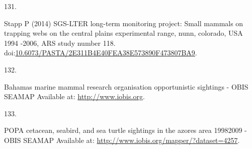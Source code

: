 \documentclass{article}
\newlength{\cslhangindent}
\newlength{\csllabelwidth}
\newlength{\cslentryspacingunit} %
\newenvironment{CSLReferences}[2] %
 {%
  \setlength{\parindent}{0pt}
  \ifodd #1
  \let\oldpar\par
  \def\par{\hangindent=\cslhangindent\oldpar}
  \fi
  \setlength{\parskip}{#2\cslentryspacingunit}
 }%
 {}
\newcommand{\CSLLeftMargin}[1]{\parbox[t]{\csllabelwidth}{#1}}
\newcommand{\CSLRightInline}[1]{\parbox[t]{\linewidth - \csllabelwidth}{#1}\break}
\begin{document}
\begin{CSLReferences}{0}{0}
\leavevmode{}%
\CSLLeftMargin{131. }%
\CSLRightInline{Stapp P (2014) SGS-LTER long-term monitoring project:
Small mammals on trapping webs on the central plains experimental range,
nunn, colorado, USA 1994 -2006, ARS study number 118.
doi:\href{https://doi.org/10.6073/PASTA/2E311B4E40FEA38E573890F473807BA9}{10.6073/PASTA/2E311B4E40FEA38E573890F473807BA9}.}

\leavevmode{}%
\CSLLeftMargin{132. }%
\CSLRightInline{Bahamas marine mammal research organisation
opportunistic sightings - OBIS SEAMAP Available at:
\url{http://www.iobis.org}.}

\leavevmode{}%
\CSLLeftMargin{133. }%
\CSLRightInline{POPA cetacean, seabird, and sea turtle sightings in the
azores area 1998{\textendash}2009 - OBIS SEAMAP Available at:
\url{http://www.iobis.org/mapper/?dataset=4257}.}

\end{CSLReferences}



\end{document}
